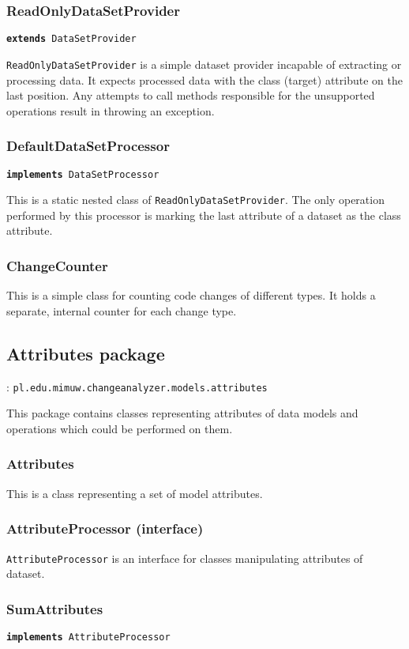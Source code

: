 \documentclass{pracamgr}
\newcommand{\pack}[3]{\subsection{#1 package} \label{sec:#2} \underline{\smash{Full package name}}: \texttt{#3}\medskip}
\newcommand{\extends}[1]{\vspace{-0.5em}\hspace{\parindent}\texttt{\textbf{extends} #1}\vspace{0.5em}}
\newcommand{\implements}[1]{\vspace{-0.5em}\hspace{\parindent}\texttt{\textbf{implements} #1}\vspace{0.5em}}
\begin{document}
\subsubsection*{ReadOnlyDataSetProvider}
\extends{DataSetProvider}

\noindent\texttt{ReadOnlyDataSetProvider} is a simple dataset provider incapable of extracting or processing data. It expects processed data with the class (target) attribute on the last position. Any attempts to call methods responsible for the unsupported operations result in throwing an exception.

\subsubsection*{DefaultDataSetProcessor}
\implements{DataSetProcessor}

\noindent This is a static nested class of \texttt{ReadOnlyDataSetProvider}. The only operation performed by this processor is marking the last attribute of a dataset as the class attribute.

\subsubsection*{ChangeCounter}
This is a simple class for counting code changes of different types. It holds a separate, internal counter for each change type.

\pack{Attributes}{attributes}{pl.edu.mimuw.changeanalyzer.models.attributes}

\noindent This package contains classes representing attributes of data models and operations which could be performed on them.

\subsubsection*{Attributes}
This is a class representing a set of model attributes.

\subsubsection*{AttributeProcessor (interface)}
\texttt{AttributeProcessor} is an interface for classes manipulating attributes of dataset.

\subsubsection*{SumAttributes}
\implements{AttributeProcessor}
\end{document}
